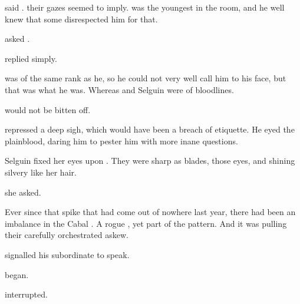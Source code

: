  said \Teshrial.   their gazes seemed to imply. \Teshrial{} was the youngest \resphan{} in the room, and he well knew that some disrespected him for that. 

 asked \Ganethed. 

 \Teshrial{} replied simply. 


  \Ganethed{} was of the same rank as he, so he could not very well call him  to his face, but that was what he was. Whereas \Teshrial{} and Selguin were of \Ketheran{} bloodlines. 

\Ganethed{} would not be bitten off.  

\Teshrial{} repressed a deep sigh, which would have been a breach of etiquette.  He eyed the plainblood, daring him to pester him with more inane questions. 

Selguin fixed her eyes upon \Teshrial. They were sharp as blades, those eyes, and shining silvery like her hair. 

 she asked. 

 Ever since that \vertex{} spike that had come out of nowhere last year, there had been an imbalance in the Cabal \Matrix. A rogue \vertex{}, yet part of the pattern. And it was pulling their carefully orchestrated \matrix{} askew. 

\Teshrial{} signalled his subordinate to speak. 

 \Achsah{} began. 

 \Ganethed{} interrupted. 

